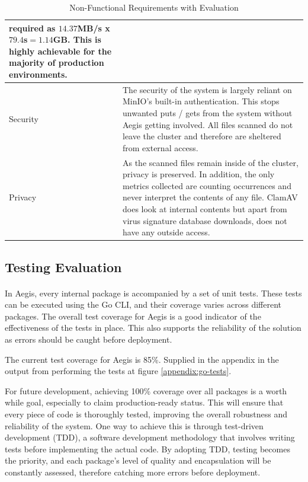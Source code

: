 \documentclass[12pt, conference, final, a4paper, onecolumn, compsoc]{IEEEtran}
\begin{document}
\begin{table}[H]
\begin{tabular}{|p{}|p{}|}
               required as $14.37$MB/s x $79.4$s$ = 1.14$GB. This is
               highly achievable for the majority of production environments. \\ \hline
    Security & The security of the system is largely reliant on MinIO's built-in
    authentication. This stops unwanted puts / gets from the system without
               Aegis getting involved. All files scanned do not leave the
               cluster and therefore are sheltered from external access. \\ \hline
    Privacy & As the scanned files remain inside of the cluster, privacy is
    preserved. In addition, the only metrics collected are counting occurrences
              and never interpret the contents of any file. ClamAV does look at
              internal contents but apart from virus signature database
              downloads, does not have any outside access. \\ \hline
  \end{tabular}
  \caption{Non-Functional Requirements with Evaluation}
  \label{tab:non_functional_reqs_evaluation}
\end{table}

\subsection{Testing Evaluation}
\paragraph{}
In Aegis, every internal package is accompanied by a set of unit tests. These
tests can be executed using the Go CLI, and their coverage varies across
different packages. The overall test coverage for Aegis is a good indicator of
the effectiveness of the tests in place. This also supports the reliability of
the solution as errors should be caught before deployment.

The current test coverage for Aegis is 85\%. Supplied in the appendix in the
output from performing the tests at figure \ref{appendix:go-tests}.

For future development, achieving 100\% coverage over all packages is a worth
while goal, especially to claim production-ready status. This will ensure that
every piece of code is thoroughly tested, improving the overall robustness and
reliability of the system. One way to achieve this is through test-driven
development (TDD), a software development methodology that involves writing
tests before implementing the actual code. By adopting TDD, testing becomes the
priority, and each package's level of quality and encapsulation will be
constantly assessed, therefore catching more errors before deployment.
\end{document}
